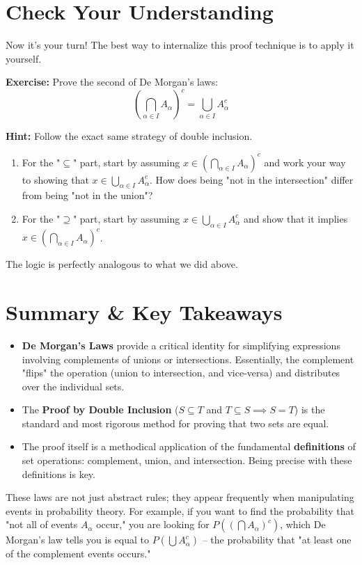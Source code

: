 \documentclass[11pt,a4paper]{article}
\begin{document}
\section{Check Your Understanding}

Now it's your turn! The best way to internalize this proof technique is to apply it yourself.

\textbf{Exercise:} Prove the second of De Morgan's laws:
$$ \left( \bigcap_{\alpha \in I} A_\alpha \right)^c = \bigcup_{\alpha \in I} A_\alpha^c $$

\textbf{Hint:} Follow the exact same strategy of double inclusion.
\begin{enumerate}
    \item For the "$\subseteq$" part, start by assuming $x \in \left( \bigcap_{\alpha \in I} A_\alpha \right)^c$ and work your way to showing that $x \in \bigcup_{\alpha \in I} A_\alpha^c$. How does being "not in the intersection" differ from being "not in the union"?
    \item For the "$\supseteq$" part, start by assuming $x \in \bigcup_{\alpha \in I} A_\alpha^c$ and show that it implies $x \in \left( \bigcap_{\alpha \in I} A_\alpha \right)^c$.
\end{enumerate}
The logic is perfectly analogous to what we did above.

\section{Summary \& Key Takeaways}

\begin{itemize}
    \item \textbf{De Morgan's Laws} provide a critical identity for simplifying expressions involving complements of unions or intersections. Essentially, the complement "flips" the operation (union to intersection, and vice-versa) and distributes over the individual sets.
    \item The \textbf{Proof by Double Inclusion} ($S \subseteq T$ and $T \subseteq S \implies S=T$) is the standard and most rigorous method for proving that two sets are equal.
    \item The proof itself is a methodical application of the fundamental \textbf{definitions} of set operations: complement, union, and intersection. Being precise with these definitions is key.
\end{itemize}

These laws are not just abstract rules; they appear frequently when manipulating events in probability theory. For example, if you want to find the probability that "not all of events $A_\alpha$ occur," you are looking for $P\left(\left(\bigcap A_\alpha\right)^c\right)$, which De Morgan's law tells you is equal to $P\left(\bigcup A_\alpha^c\right)$ -- the probability that "at least one of the complement events occurs."
\end{document}
